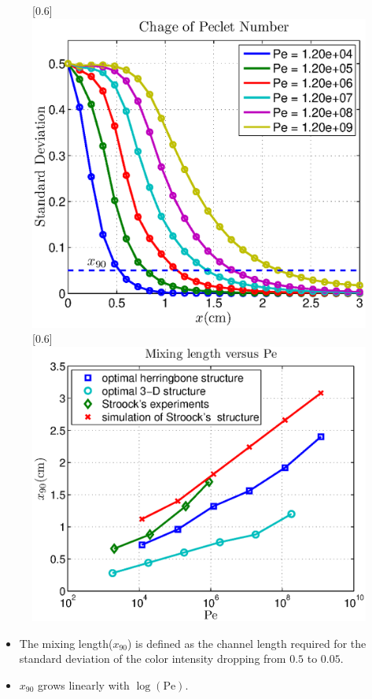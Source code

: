 \documentclass[dvips,landscape]{foils}
\begin{document}
  \begin{figure}
    \centerline{
       \scalebox{0.6}[0.6]{\includegraphics{example2veryPe2}}
       \scalebox{0.6}[0.6]{\includegraphics{example2mixinglength2}}
    }
  \end{figure}
\begin{itemize}\setlength{\parskip}{0pt}  \setlength{\itemsep}{10pt} \setlength{\topsep}{0pt}
\item The mixing length($x_{90}$) is defined as the channel length required for the standard deviation of the color intensity dropping from $0.5$ to $0.05$. 
\item $x_{90}$ grows linearly with $\log(\text{Pe})$.
\end{itemize}
\end{document}
